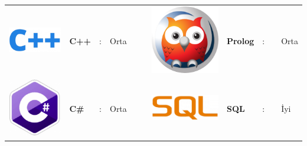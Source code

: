 \documentclass[paper=a4,fontsize=11pt]{temp} %
\begin{document}
\begin{minipage}[t]{0.66\textwidth}
\begin{tabular}{lllllllllll}
\includegraphics[scale=0.05]{IMG/languages/cplusplus} & \textbf{C++}      & : & Orta  &  &  & \includegraphics[scale=0.03]{IMG/languages/prolog} & \textbf{Prolog}     & : &  & Orta  \\
\includegraphics[scale=0.05]{IMG/languages/csharp} & \textbf{C\#}      & : & Orta  &  &  & \includegraphics[scale=0.06]{IMG/languages/sql} & \textbf{SQL}        & : &  & İyi   \\

\end{tabular}
\end{minipage}
\end{document}
